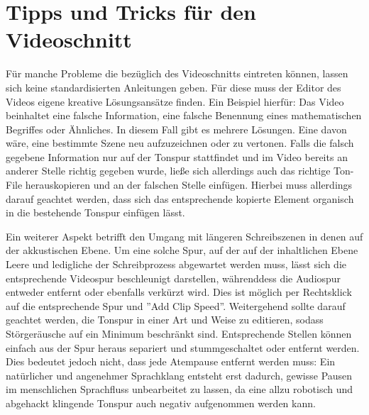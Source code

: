 \documentclass{scrreprt}
\begin{document}
\section{Tipps und Tricks für den Videoschnitt}
Für manche Probleme die bezüglich des Videoschnitts  eintreten können, lassen sich keine standardisierten Anleitungen geben. Für diese muss der Editor des Videos eigene kreative Lösungsansätze finden. Ein Beispiel hierfür: Das Video beinhaltet eine falsche Information, eine falsche Benennung eines mathematischen Begriffes oder Ähnliches. In diesem Fall gibt es mehrere Lösungen. Eine davon wäre, eine bestimmte Szene neu aufzuzeichnen oder zu vertonen. Falls die falsch gegebene Information nur auf der Tonspur stattfindet und im Video bereits an anderer Stelle richtig gegeben wurde, ließe sich allerdings auch das richtige Ton-File herauskopieren und an der falschen Stelle einfügen. Hierbei muss allerdings darauf geachtet werden, dass sich das entsprechende kopierte Element organisch in die bestehende Tonspur einfügen lässt. 

Ein weiterer Aspekt betrifft den Umgang mit längeren Schreibszenen in denen auf der akkustischen Ebene. Um eine solche Spur, auf der auf der inhaltlichen Ebene Leere und ledigliche der Schreibprozess abgewartet werden muss, lässt sich die entsprechende Videospur beschleunigt darstellen, währenddess die Audiospur entweder entfernt oder ebenfalls verkürzt wird. Dies ist möglich per Rechtsklick auf die entsprechende Spur und ''Add Clip Speed''. Weitergehend sollte darauf geachtet werden, die Tonspur in einer Art und Weise zu editieren, sodass Störgeräusche auf ein Minimum beschränkt sind. Entsprechende Stellen können einfach aus der Spur heraus separiert und stummgeschaltet oder entfernt werden. Dies bedeutet jedoch nicht, dass jede Atempause entfernt werden muss: Ein natürlicher und angenehmer Sprachklang entsteht erst dadurch, gewisse Pausen im menschlichen Sprachfluss unbearbeitet zu lassen, da eine allzu robotisch und abgehackt klingende Tonspur auch negativ aufgenommen werden kann.




\pagebreak
\end{document}
